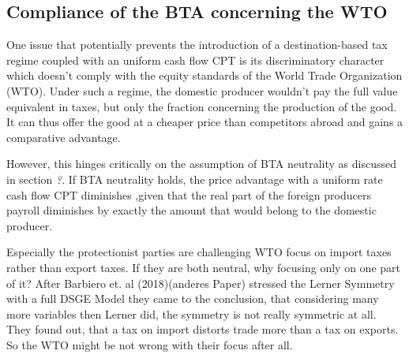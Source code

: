 \subsection{Compliance of the BTA concerning the WTO}
One issue that potentially prevents the introduction of a destination-based tax regime coupled with an uniform cash flow CPT is its discriminatory character which doesn't comply with the equity standards of the World Trade Organization (WTO). Under such a regime, the domestic producer wouldn't pay the full value equivalent in taxes, but only the fraction concerning the production of the good. It can thus offer the good at a cheaper price than competitors abroad and gains a comparative advantage. 

However, this hinges critically on the assumption of BTA neutrality as discussed in section \textit{?}. If BTA neutrality holds, the price advantage with a uniform rate cash flow CPT diminishes ,given that the real part of the foreign producers payroll diminishes by exactly the amount that would belong to the domestic producer. 

Especially the protectionist parties are challenging WTO focus on import taxes rather than export taxes. If they are both neutral, why focusing only on one part of it? After Barbiero et. al (2018)(anderes Paper) stressed the Lerner Symmetry with a full DSGE Model they came to the conclusion, that considering many more variables then Lerner did, the symmetry is not really symmetric at all. They found out, that a tax on import distorts trade more than a tax on exports. So the WTO might be not wrong with their focus after all.
